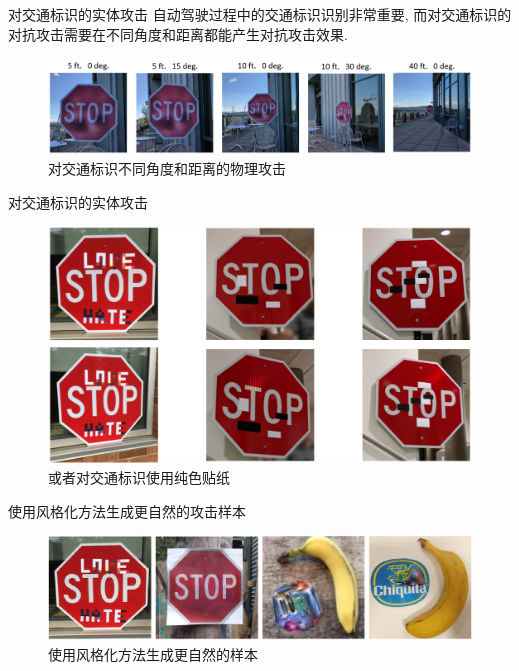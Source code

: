 \documentclass[UTF8, aspectratio=169, 10pt, t]{ctexbeamer}
\begin{document}
\begin{frame}{对交通标识的实体攻击}
	自动驾驶过程中的交通标识识别非常重要, 而对交通标识的对抗攻击需要在不同角度和距离都能产生对抗攻击效果.
	\begin{figure}
		\centering
		\includegraphics[width=\linewidth]{phy1}
		\caption{对交通标识不同角度和距离的物理攻击}
		\label{fig:phy1}
	\end{figure}
	
\end{frame}

\begin{frame}{对交通标识的实体攻击}
	\begin{figure}
		\centering
		\includegraphics[width=0.7\linewidth]{phy4}
		\caption{或者对交通标识使用纯色贴纸}
		\label{fig:phy4}
	\end{figure}
	
\end{frame}

\begin{frame}{使用风格化方法生成更自然的攻击样本}
	\begin{figure}
		\centering
		\includegraphics[width=\linewidth]{phy5}
		\caption{使用风格化方法生成更自然的样本}
		\label{fig:phy5}
	\end{figure}
	
\end{frame}
\end{document}
